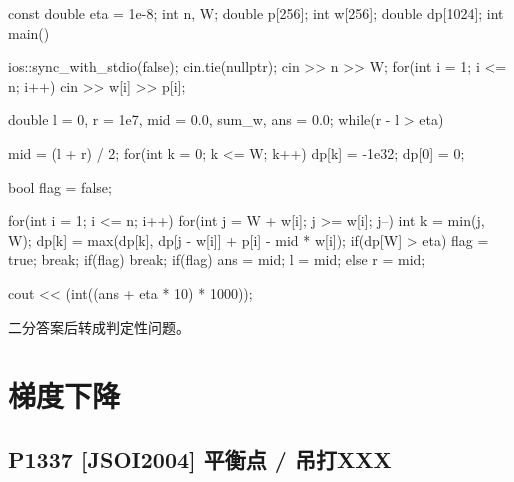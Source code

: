 \begin{codeline}
const double eta = 1e-8;
int n, W;
double p[256];
int w[256];
double dp[1024];
int main() {
    ios::sync_with_stdio(false);
    cin.tie(nullptr);
    cin >> n >> W;
    for(int i = 1; i <= n; i++) {
        cin >> w[i] >> p[i];
    }

    double l = 0, r = 1e7, mid = 0.0, sum_w, ans = 0.0;
    while(r - l > eta) {
        mid = (l + r) / 2;
        for(int k = 0; k <= W; k++) {
            dp[k] = -1e32;
        }
        dp[0] = 0;

        bool flag = false;

        for(int i = 1; i <= n; i++) {
            for(int j = W + w[i]; j >= w[i]; j--) {
                int k = min(j, W);
                dp[k] = max(dp[k], dp[j - w[i]] + p[i] - mid * w[i]);
                if(dp[W] > eta) {
                    flag = true;
                    break;
                }
            }
            if(flag) {
                break;
            }
        }
        if(flag) {
            ans = mid;
            l = mid;
        } else {
            r = mid;
        }
    }

    cout << (int((ans + eta * 10) * 1000));
}
\end{codeline}
\begin{warnbox}
二分答案后转成判定性问题。
\end{warnbox}

\section{梯度下降}
\subsection{P1337 {[}JSOI2004{]} 平衡点 / 吊打XXX}\label{p1337-jsoi2004-ux5e73ux8861ux70b9-ux540aux6253xxx}






